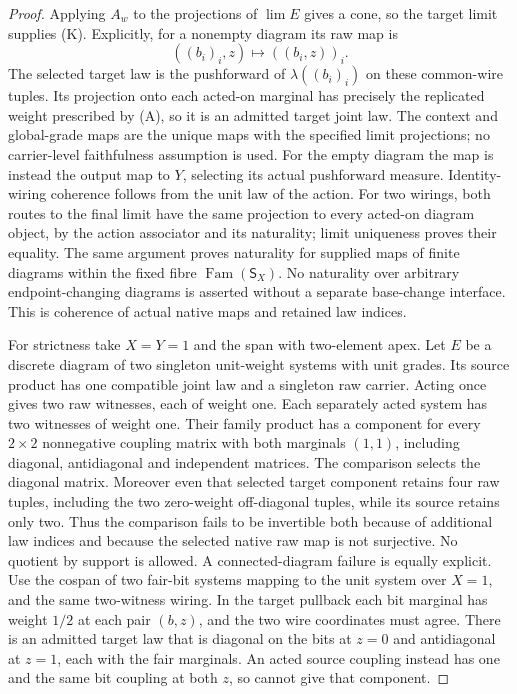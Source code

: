 \documentclass{article}
\begin{document}
\begin{proof}
Applying $A_w$ to the projections of $\lim E$ gives a cone, so the target limit supplies (K). Explicitly, for a nonempty diagram its raw map is
\[((b_i)_i,z)\longmapsto((b_i,z))_i.\]
The selected target law is the pushforward of $\lambda((b_i)_i)$ on these common-wire tuples. Its projection onto each acted-on marginal has precisely the replicated weight prescribed by (A), so it is an admitted target joint law. The context and global-grade maps are the unique maps with the specified limit projections; no carrier-level faithfulness assumption is used. For the empty diagram the map is instead the output map to $Y$, selecting its actual pushforward measure. Identity-wiring coherence follows from the unit law of the action. For two wirings, both routes to the final limit have the same projection to every acted-on diagram object, by the action associator and its naturality; limit uniqueness proves their equality. The same argument proves naturality for supplied maps of finite diagrams within the fixed fibre $\operatorname{Fam}(\mathsf S_X)$. No naturality over arbitrary endpoint-changing diagrams is asserted without a separate base-change interface. This is coherence of actual native maps and retained law indices.

For strictness take $X=Y=1$ and the span with two-element apex. Let $E$ be a discrete diagram of two singleton unit-weight systems with unit grades. Its source product has one compatible joint law and a singleton raw carrier. Acting once gives two raw witnesses, each of weight one. Each separately acted system has two witnesses of weight one. Their family product has a component for every $2\times2$ nonnegative coupling matrix with both marginals $(1,1)$, including diagonal, antidiagonal and independent matrices. The comparison selects the diagonal matrix. Moreover even that selected target component retains four raw tuples, including the two zero-weight off-diagonal tuples, while its source retains only two. Thus the comparison fails to be invertible both because of additional law indices and because the selected native raw map is not surjective. No quotient by support is allowed. A connected-diagram failure is equally explicit. Use the cospan of two fair-bit systems mapping to the unit system over $X=1$, and the same two-witness wiring. In the target pullback each bit marginal has weight $1/2$ at each pair $(b,z)$, and the two wire coordinates must agree. There is an admitted target law that is diagonal on the bits at $z=0$ and antidiagonal at $z=1$, each with the fair marginals. An acted source coupling instead has one and the same bit coupling at both $z$, so cannot give that component.
\end{proof}
\end{document}
